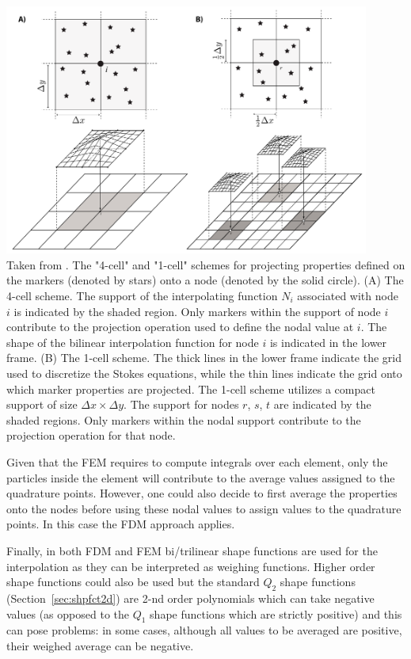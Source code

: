 \begin{center}
\includegraphics[width=12cm]{images/dumg11}\\
{\captionfont Taken from \cite{dumg11}. The "4-cell" and "1-cell" schemes for projecting properties defined on the 
markers (denoted by stars) onto
a node (denoted by the solid circle). (A) The 4-cell scheme. The support of the interpolating function $N_i$ associated
with node $i$ is indicated by the shaded region. Only markers within the support of node $i$ contribute to the projection
operation used to define the nodal value at $i$. The shape of the bilinear interpolation function for node $i$ is indicated in
the lower frame. (B) The 1-cell scheme. The thick lines in the lower frame indicate the grid used to discretize the
Stokes equations, while the thin lines indicate the grid onto which marker properties are projected. The 1-cell scheme
utilizes a compact support of size $\Delta x \times  \Delta y$. The support for nodes $r$, $s$, $t$ are indicated by 
the shaded regions. Only
markers within the nodal support contribute to the projection operation for that node.}
\end{center}

Given that the FEM requires to compute integrals over each element, only the particles inside the element will contribute 
to the average values assigned to the quadrature points. However, one could also decide to first average the properties onto the nodes
before using these nodal values to assign values to the quadrature points. In this case the FDM approach applies. 

Finally, in both FDM and FEM bi/trilinear shape functions are used for the interpolation as they can be interpreted as weighing 
functions. Higher order shape functions could also be used but the standard $Q_2$ shape functions (Section~\ref{sec:shpfct2d})
are 2-nd order polynomials which can take negative values (as opposed to the $Q_1$ shape functions which are strictly positive)
and this can pose problems: in some cases, although all values to be averaged are positive, their weighed average can be negative.

